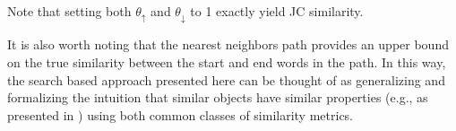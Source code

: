 Note that setting both $\theta_\uparrow$ and $\theta_\downarrow$ to 1 exactly
  yield JC similarity.

It is also worth noting that the nearest neighbors path provides an
  upper bound on the true similarity between the start and end words
  in the path.
In this way, the search based approach presented here can be thought
  of as generalizing and formalizing the intuition that similar objects 
  have similar properties (e.g., as presented in
  ) using both common classes of similarity
  metrics.
